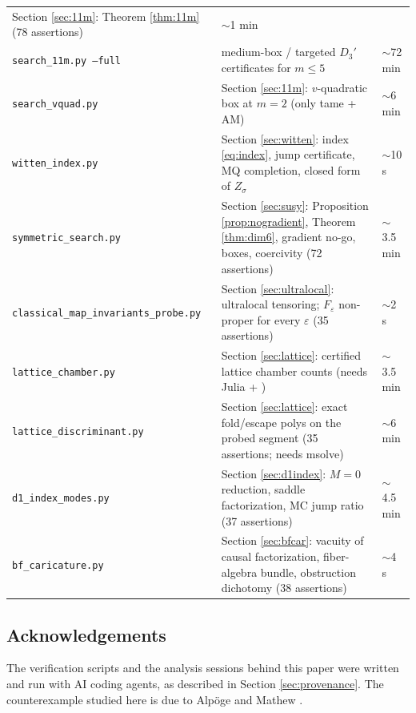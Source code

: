 \documentclass[11pt]{article}
\theoremstyle{definition}
\theoremstyle{remark}
\begin{document}
\begin{center}
\begin{tabular}{l p{6.4cm} l}
 Section \ref{sec:11m}: Theorem \ref{thm:11m} (78 assertions) &
 $\sim$1 min \\
\texttt{search\_11m.py --full} &
 medium-box / targeted $D_3'$ certificates for $m\le 5$ &
 $\sim$72 min \\
\texttt{search\_vquad.py} &
 Section \ref{sec:11m}: $v$-quadratic box at $m=2$ (only tame + AM) &
 $\sim$6 min \\
\texttt{witten\_index.py} &
 Section \ref{sec:witten}: index \eqref{eq:index}, jump certificate,
 MQ completion, closed form of $Z_\sigma$ & $\sim$10 s \\
\texttt{symmetric\_search.py} &
 Section \ref{sec:susy}: Proposition \ref{prop:nogradient}, Theorem
 \ref{thm:dim6}, gradient no-go, boxes, coercivity (72 assertions) &
 $\sim$3.5 min \\
\texttt{classical\_map\_invariants\_probe.py} &
 Section \ref{sec:ultralocal}: ultralocal tensoring;
 $F_\varepsilon$ non-proper for every $\varepsilon$ (35 assertions) &
 $\sim$2 s \\
\texttt{lattice\_chamber.py} &
 Section \ref{sec:lattice}: certified lattice chamber counts (needs
 Julia + \cite{HCjl}) & $\sim$3.5 min \\
\texttt{lattice\_discriminant.py} &
 Section \ref{sec:lattice}: exact fold/escape polys on the probed
 segment (35 assertions; needs msolve) & $\sim$6 min \\
\texttt{d1\_index\_modes.py} &
 Section \ref{sec:d1index}: $M{=}0$ reduction, saddle factorization,
 MC jump ratio (37 assertions) & $\sim$4.5 min \\
\texttt{bf\_caricature.py} &
 Section \ref{sec:bfcar}: vacuity of causal factorization,
 fiber-algebra bundle, obstruction dichotomy (38 assertions) &
 $\sim$4 s \\
\hline
\end{tabular}
\end{center}

\subsection*{Acknowledgements}

The verification scripts and the analysis sessions behind this paper
were written and run with AI coding agents, as described in Section
\ref{sec:provenance}. The counterexample studied here is due to
Alp\"oge and Mathew \cite{AM26}.
\end{document}
